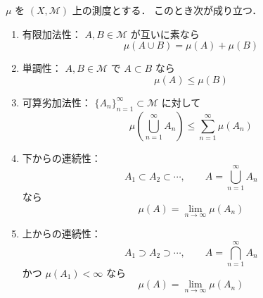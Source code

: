 \begin{proposition}[測度の基本性質]
$\mu$ を $(X,\mathcal M)$ 上の測度とする．
このとき次が成り立つ．
\begin{enumerate}
    \item 有限加法性：
    $A,B \in \mathcal M$ が互いに素なら
    \[
    \mu(A\cup B)=\mu(A)+\mu(B)
    \]
    \item 単調性：
    $A,B \in \mathcal M$ で $A \subset B$ なら
    \[
    \mu(A)\le \mu(B)
    \]
    \item 可算劣加法性：
    $\{A_n\}_{n=1}^{\infty}\subset\mathcal M$ に対して
    \[
    \mu\left(\bigcup_{n=1}^{\infty}A_n\right)
    \le
    \sum_{n=1}^{\infty}\mu(A_n)
    \]
    \item 下からの連続性：
    \[
    A_1\subset A_2\subset \cdots,\qquad A=\bigcup_{n=1}^{\infty}A_n
    \]
    なら
    \[
    \mu(A)=\lim_{n\to\infty}\mu(A_n)
    \]
    \item 上からの連続性：
    \[
    A_1\supset A_2\supset \cdots,\qquad A=\bigcap_{n=1}^{\infty}A_n
    \]
    かつ $\mu(A_1)<\infty$ なら
    \[
    \mu(A)=\lim_{n\to\infty}\mu(A_n)
    \]
\end{enumerate}
\end{proposition}
